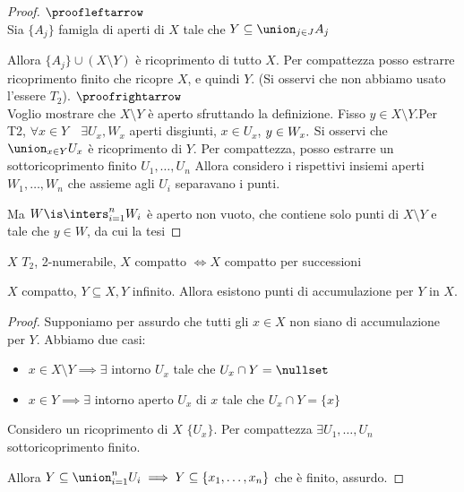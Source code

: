 \begin{proof}
 $\\\proofleftarrow$\\
 Sia $ \{ A_j  \}$ famigla di aperti di $X$ tale che $Y\subseteq \union_{j\in J}A_j$
 
 Allora $ \{ A_j  \} \cup (X\setminus Y)$ è ricoprimento di tutto $X$.
 Per compattezza posso estrarre ricoprimento finito che ricopre $X$, e quindi $Y$. (Si osservi che non abbiamo usato l'essere $T_2$).
 $\\\proofrightarrow$\\
 Voglio mostrare che $X\setminus Y$ è aperto sfruttando la definizione.
 Fisso $y\in X\setminus Y$.Per T2, $\forall x\in Y\quad \exists U_x, W_x$ aperti disgiunti, $x\in U_x$, $y\in W_x.\\$ 
 Si osservi che $\union_{x\in Y}U_x$ è ricoprimento di $Y$. Per compattezza, posso estrarre un sottoricoprimento finito $U_1,\dots, U_n$
 Allora considero i rispettivi insiemi aperti $W_1,\dots, W_n$ che assieme agli $U_i$ separavano i punti.
  
 Ma $W\is \inters_{i=1}^nW_i$ è aperto non vuoto, che contiene solo punti di $X\setminus Y$ e tale che $y\in W$, da cui la tesi  
 \end{proof}
\begin{prop}
 $X$ $T_2$, 2-numerabile, $ X$ compatto $\iff X$ compatto per successioni
\end{prop}
 \begin{lemma}
  $X$ compatto, $Y\subseteq X, Y$ infinito. Allora esistono punti di accumulazione per $Y$ in $X$.
 \end{lemma}
 \begin{proof}
  Supponiamo per assurdo che tutti gli $x\in X$ non siano di accumulazione per $Y$. Abbiamo due casi:
	\begin{itemize}
	 \item $x\in X\setminus Y\implies \exists$ intorno $U_x$ tale che $U_x\cap Y = \nullset$
	 \item $x\in Y\implies \exists$ intorno aperto $U_x$ di $x$ tale che $U_x\cap Y = \{ x \}$
	\end{itemize}
  Considero un ricoprimento di $X$ $\{ U_x \}$. Per compattezza $\exists U_1,\dots, U_n$ sottoricoprimento finito.
  
  Allora $Y\subseteq \union_{i=1}^nU_i\implies Y\subseteq \left \{ x_1,\dots,x_n\right \}$ che è finito, assurdo.
 \end{proof}








